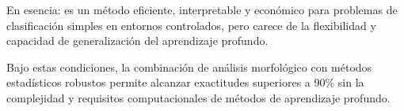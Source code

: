 En esencia: es un método eficiente, interpretable y económico para problemas de clasificación simples en entornos controlados, pero carece de la flexibilidad y capacidad de generalización del aprendizaje profundo.

Bajo estas condiciones, la combinación de análisis morfológico con métodos estadísticos robustos permite alcanzar exactitudes superiores a 90\% sin la complejidad y requisitos computacionales de métodos de aprendizaje profundo.
